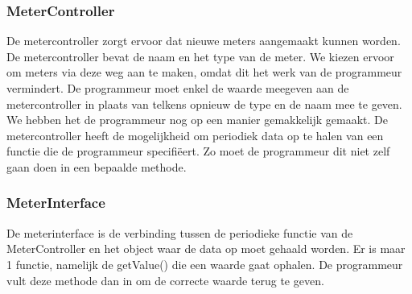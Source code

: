 \subsubsection{MeterController}
De metercontroller zorgt ervoor dat nieuwe meters aangemaakt kunnen worden. De metercontroller bevat de naam en het type van de meter. We kiezen ervoor om meters via deze weg aan te maken, omdat dit het werk van de programmeur vermindert. De programmeur moet enkel de waarde meegeven aan de metercontroller in plaats van telkens opnieuw de type en de naam mee te geven. We hebben het de programmeur nog op een manier gemakkelijk gemaakt. De metercontroller heeft de mogelijkheid om periodiek data op te halen van een functie die de programmeur specifiëert. Zo moet de programmeur dit niet zelf gaan doen in een bepaalde methode. 

\subsubsection{MeterInterface}
De meterinterface is de verbinding tussen de periodieke functie van de MeterController en het object waar de data op moet gehaald worden. Er is maar 1 functie, namelijk de getValue() die een waarde gaat ophalen. De programmeur vult deze methode dan in om de correcte waarde terug te geven.





